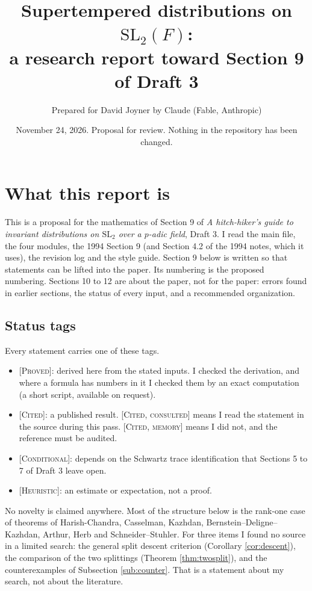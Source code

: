 \documentclass[12pt,letterpaper]{amsart}
\title[Supertempered distributions on $\mathrm{SL}_2(F)$]{Supertempered distributions on $\mathrm{SL}_2(F)$:\\ a research report toward Section 9 of Draft 3}
\author{Prepared for David Joyner by Claude (Fable, Anthropic)}
\date{November 24, 2026. Proposal for review. Nothing in the repository has been changed.}
\numberwithin{equation}{section}
\theoremstyle{definition}
\theoremstyle{remark}
\newcommand{\status}[1]{\textup{[\textsc{#1}]}}
\begin{document}
\maketitle

\section*{What this report is}
This is a proposal for the mathematics of Section 9 of \emph{A hitch-hiker's guide to invariant distributions on $\mathrm{SL}_2$ over a $p$-adic field}, Draft 3. I read the main file, the four modules, the 1994 Section 9 (and Section 4.2 of the 1994 notes, which it uses), the revision log and the style guide. Section 9 below is written so that statements can be lifted into the paper. Its numbering is the proposed numbering. Sections 10 to 12 are about the paper, not for the paper: errors found in earlier sections, the status of every input, and a recommended organization.

\subsection*{Status tags}
Every statement carries one of these tags.
\begin{itemize}[leftmargin=*]
\item \status{Proved}: derived here from the stated inputs. I checked the derivation, and where a formula has numbers in it I checked them by an exact computation (a short script, available on request).
\item \status{Cited}: a published result. \status{Cited, consulted} means I read the statement in the source during this pass. \status{Cited, memory} means I did not, and the reference must be audited.
\item \status{Conditional}: depends on the Schwartz trace identification that Sections 5 to 7 of Draft 3 leave open.
\item \status{Heuristic}: an estimate or expectation, not a proof.
\end{itemize}
No novelty is claimed anywhere. Most of the structure below is the rank-one case of theorems of Harish-Chandra, Casselman, Kazhdan, Bernstein--Deligne--Kazhdan, Arthur, Herb and Schneider--Stuhler. For three items I found no source in a limited search: the general split descent criterion (Corollary \ref{cor:descent}), the comparison of the two splittings (Theorem \ref{thm:twosplit}), and the counterexamples of Subsection \ref{sub:counter}. That is a statement about my search, not about the literature.
\end{document}
